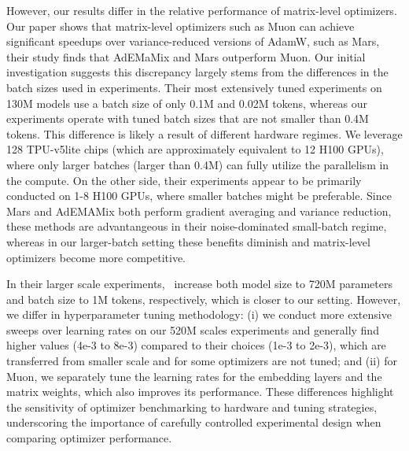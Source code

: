 However, our results differ in the relative performance of matrix-level optimizers. Our paper shows that matrix-level optimizers such as Muon can achieve significant speedups over variance-reduced versions of AdamW, such as Mars, their study finds that AdEMaMix and Mars outperform Muon.  Our initial investigation suggests this discrepancy largely stems from the differences in the batch sizes used in experiments. Their most extensively tuned experiments on 130M models use a batch size of only 0.1M and 0.02M tokens, whereas our experiments operate with tuned batch sizes that are not smaller than 0.4M tokens. This difference is likely a result of different hardware regimes. We leverage 128 TPU-v5lite chips (which are approximately equivalent to 12 H100 GPUs), where only larger batches (larger than 0.4M) can fully utilize the parallelism in the compute. On the other side, their experiments appear to be primarily conducted on 1-8 H100 GPUs, where smaller batches might be preferable. Since Mars and AdEMAMix both perform gradient averaging and variance reduction, these methods are advantangeous in their noise-dominated small-batch regime, whereas in our larger-batch setting these benefits diminish and matrix-level optimizers become more competitive. 

In their larger scale experiments,~\citet{semenov2025benchmarkingoptimizerslargelanguage} increase both model size to 720M parameters and batch size to 1M tokens, respectively, which is closer to our setting. However, we differ in hyperparameter tuning methodology: (i) we conduct more extensive sweeps over learning rates on our 520M scales experiments and generally find higher values (4e-3 to 8e-3) compared to their choices (1e-3 to 2e-3), which are transferred from smaller scale and for some optimizers are not tuned; and (ii) for Muon, we separately tune the learning rates for the embedding layers and the matrix weights, which also improves its performance. These differences highlight the sensitivity of optimizer benchmarking to hardware and tuning strategies, underscoring the importance of carefully controlled experimental design when comparing optimizer performance.
